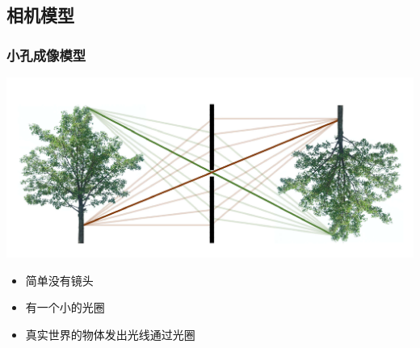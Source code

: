 \documentclass[aspectratio=43]{beamer}
\begin{document}
\subsection{相机模型}
\begin{frame}
	\frametitle{小孔成像模型}
	\begin{center}
		\includegraphics[scale=0.3]{小孔成像模型1}
	\end{center}
	\begin{center}
		\begin{itemize}
			\item 简单没有镜头
			\item 有一个小的光圈
			\item 真实世界的物体发出光线通过光圈
		\end{itemize}
	\end{center}
	
\end{frame}
\end{document}
